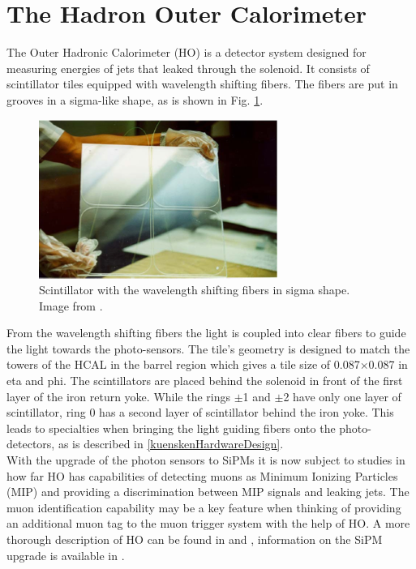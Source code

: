 \section{The Hadron Outer Calorimeter}\label{HOIntro}
The Outer Hadronic Calorimeter (HO) is a detector system designed for measuring energies of jets that leaked through the solenoid. It consists of scintillator tiles equipped with wavelength shifting fibers. The fibers are put in grooves in a sigma-like shape, as is shown in Fig. \ref{kuenskenScintWithFiber}.
\begin{figure}[h]
\centering
\begin{minipage}[t]{0.475\textwidth}
\includegraphics[width=\textwidth]{Figures/kuensken/hoTile.png}
\caption{Scintillator with the wavelength shifting fibers in sigma shape. Image from \cite{hoDesign}.}
\label{kuenskenScintWithFiber}
\end{minipage}
\hspace{1cm}
\begin{minipage}[t]{0.435\textwidth}

\end{minipage}
\end{figure}
From the wavelength shifting fibers the light is coupled into clear fibers to guide the light towards the photo-sensors. The tile's geometry is designed to match the towers of the HCAL in the barrel region which gives a tile size of 0.087$\times$0.087 in eta and phi. The scintillators are placed behind the solenoid in front of the first layer of the iron return yoke. While the rings $\pm$1 and $\pm$2 have only one layer of scintillator, ring 0 has a second layer of scintillator behind the iron yoke. This leads to specialties when bringing the light guiding fibers onto the photo-detectors, as is described in \ref{kuenskenHardwareDesign}.\\
With the upgrade of the photon sensors to SiPMs it is now subject to studies in how far HO has capabilities of detecting muons as Minimum Ionizing Particles (MIP) and providing a discrimination between MIP signals and leaking jets. The muon identification capability may be a key feature when thinking of providing an additional muon tag to the muon trigger system with the help of HO. A more thorough description of HO can be found in \cite{hcalTDR} and \cite{hoDesign}, information on the SiPM upgrade is available in \cite{beniCalor}.
